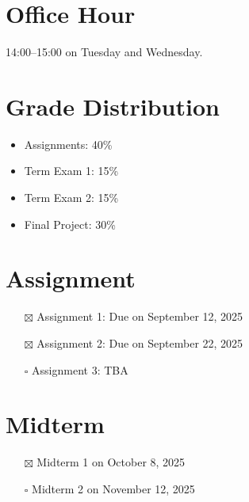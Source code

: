 \documentclass[
  letterpaper,
  DIV=11,
  numbers=noendperiod]{scrreprt}
\providecommand{\tightlist}{%
  \setlength{\itemsep}{0pt}\setlength{\parskip}{0pt}}
\begin{document}
\section*{Office Hour}\label{office-hour}


14:00--15:00 on Tuesday and Wednesday.

\section*{Grade Distribution}\label{grade-distribution}


\begin{itemize}
\tightlist
\item
  Assignments: 40\%
\item
  Term Exam 1: 15\%
\item
  Term Exam 2: 15\%
\item
  Final Project: 30\%
\end{itemize}

\section*{Assignment}\label{assignment}


\begin{itemize}
\tightlist
\item[$\boxtimes$]
  Assignment 1: Due on September 12, 2025
\item[$\boxtimes$]
  Assignment 2: Due on September 22, 2025
\item[$\square$]
  Assignment 3: TBA
\end{itemize}

\section*{Midterm}\label{midterm}


\begin{itemize}
\tightlist
\item[$\boxtimes$]
  Midterm 1 on October 8, 2025
\item[$\square$]
  Midterm 2 on November 12, 2025
\end{itemize}
\end{document}
